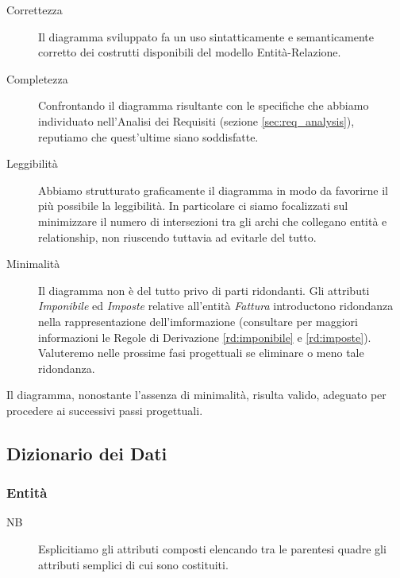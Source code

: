 		\begin{description}
			\item[Correttezza] Il diagramma sviluppato fa un uso sintatticamente e semanticamente corretto dei costrutti disponibili del modello Entità-Relazione.
			\item[Completezza] Confrontando il diagramma risultante con le specifiche che abbiamo individuato nell'Analisi dei Requisiti (sezione \ref{sec:req_analysis}), reputiamo che quest'ultime siano soddisfatte.
			\item[Leggibilità] Abbiamo strutturato graficamente il diagramma in modo da favorirne il più possibile la leggibilità. In particolare ci siamo focalizzati sul minimizzare il numero di intersezioni tra gli archi che collegano entità e relationship, non riuscendo tuttavia ad evitarle del tutto.
			\item[Minimalità] Il diagramma non è del tutto privo di parti ridondanti. Gli attributi \emph{Imponibile} ed \emph{Imposte} relative all'entità \emph{Fattura} introductono ridondanza nella rappresentazione dell'imformazione (consultare per maggiori informazioni le Regole di Derivazione \ref{rd:imponibile} e \ref{rd:imposte}). Valuteremo nelle prossime fasi progettuali se eliminare o meno tale ridondanza.
		\end{description}
		
		Il diagramma, nonostante l'assenza di minimalità, risulta valido, adeguato per procedere ai successivi passi progettuali.
	
	\subsection{Dizionario dei Dati}
	\label{sec:data_dict}
		
		\subsubsection{Entità}
		\label{sec:entities}
			
			\begin{description}
				\item[NB] Esplicitiamo gli attributi composti elencando tra le parentesi quadre gli attributi semplici di cui sono costituiti.
			\end{description}
	
